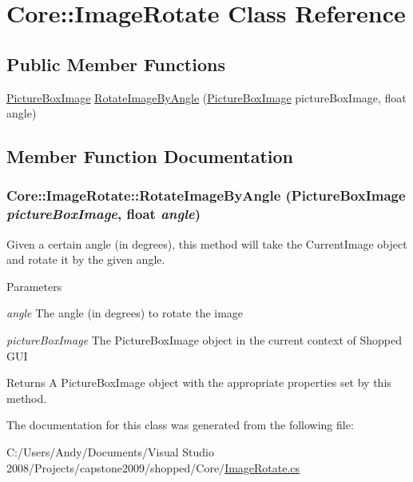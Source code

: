 \hypertarget{class_core_1_1_image_rotate}{
\section{Core::ImageRotate Class Reference}
\label{class_core_1_1_image_rotate}
}
\subsection*{Public Member Functions}
\begin{DoxyCompactItemize}
\item 
\hyperlink{class_core_1_1_images_1_1_picture_box_image}{PictureBoxImage} \hyperlink{class_core_1_1_image_rotate_a91a3f42429410a198f3b05719d7307f3}{RotateImageByAngle} (\hyperlink{class_core_1_1_images_1_1_picture_box_image}{PictureBoxImage} pictureBoxImage, float angle)
\end{DoxyCompactItemize}


\subsection{Member Function Documentation}
\hypertarget{class_core_1_1_image_rotate_a91a3f42429410a198f3b05719d7307f3}{
\subsubsection[{RotateImageByAngle}]{ Core::ImageRotate::RotateImageByAngle ({\bf PictureBoxImage} {\em pictureBoxImage}, \/  float {\em angle})}}
\label{class_core_1_1_image_rotate_a91a3f42429410a198f3b05719d7307f3}
Given a certain angle (in degrees), this method will take the CurrentImage object and rotate it by the given angle.


\begin{DoxyParams}{Parameters}
\item[{\em angle}]The angle (in degrees) to rotate the image \item[{\em pictureBoxImage}]The PictureBoxImage object in the current context of Shopped GUI \end{DoxyParams}
\begin{DoxyReturn}{Returns}
A PictureBoxImage object with the appropriate properties set by this method. 
\end{DoxyReturn}


The documentation for this class was generated from the following file:\begin{DoxyCompactItemize}
\item 
C:/Users/Andy/Documents/Visual Studio 2008/Projects/capstone2009/shopped/Core/\hyperlink{_image_rotate_8cs}{ImageRotate.cs}\end{DoxyCompactItemize}
